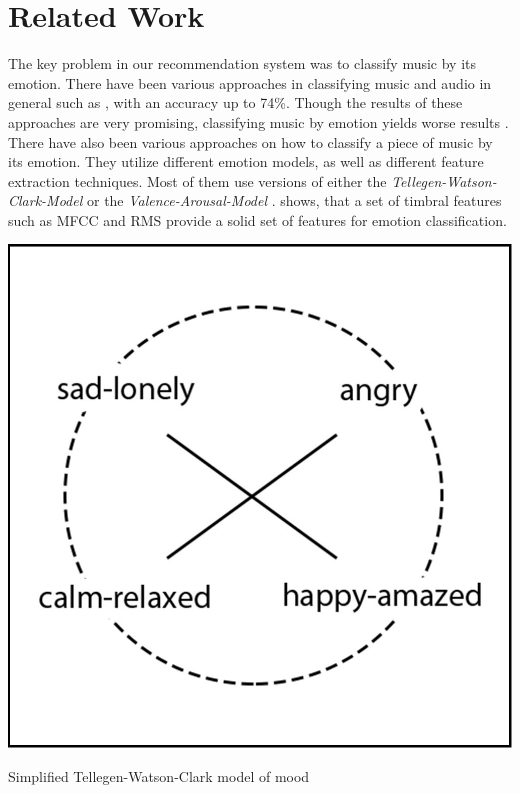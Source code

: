\documentclass{sigchi-ext}
\begin{document}
\section{Related Work}
The key problem in our recommendation system was to classify music by its emotion. There have been various approaches in classifying music and audio in general such as \cite{Mckinney2003,Tzanetakis2002}, with an accuracy up to 74\%. Though the results of these approaches are very promising, classifying music by emotion yields worse results \cite{Kim2010, Baum2006}. There have also been various approaches on how to classify a piece of music by its emotion. They utilize different emotion models, as well as different feature extraction techniques. Most of them use versions of either the \textit{Tellegen-Watson-Clark-Model} \cite{Trohidis2011} or the \textit{Valence-Arousal-Model} \cite{Kim2011}. \cite{Kim2010} shows, that a set of timbral features such as MFCC and RMS provide a solid set of features for emotion classification.

\begin{marginfigure}[0pc]
  \begin{minipage}{\marginparwidth}
    \centering
    \includegraphics[width=1.0\marginparwidth]{images/emotion-model.jpg}
    \caption{Simplified Tellegen-Watson-Clark model of mood \cite{Tellegen1999}}~\label{fig:tellegen-watson-clark}
  \end{minipage}
\end{marginfigure}
\end{document}
